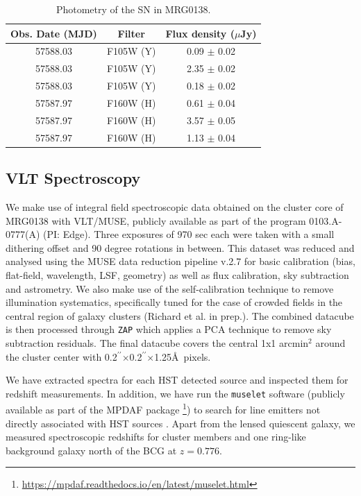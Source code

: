 \documentclass[12pt,dvipsnames]{article}
\gdef\arcsec{$^{\prime\prime}$}
\begin{document}
\begin{table}[h]
\centering
\begin{tabular}{ccc}
Obs. Date (MJD) & Filter & Flux density ($\mu$Jy) \\
\midrule
57588.03 & F105W (Y) & 0.09  $\pm$ 0.02 \\
57588.03 & F105W (Y) & 2.35  $\pm$ 0.02 \\
57588.03 & F105W (Y) & 0.18  $\pm$ 0.02 \\
57587.97 & F160W (H) & 0.61  $\pm$ 0.04 \\
57587.97 & F160W (H) & 3.57  $\pm$ 0.05 \\
57587.97 & F160W (H) & 1.13  $\pm$ 0.04 \\
\end{tabular}
\caption{Photometry of the SN in MRG0138.
\label{tab:photometry}}
\end{table}

\subsection*{VLT Spectroscopy}
\label{sec:vltmuse}

We make use of integral field spectroscopic data obtained on the cluster core of MRG0138 with VLT/MUSE, publicly 
available as part of the program 0103.A-0777(A) (PI: Edge). Three exposures of 970 sec each were taken with a small dithering offset and 90 degree rotations in between. This dataset was reduced and analysed using the MUSE data reduction pipeline v.2.7 \cite{weilbacher_data_2020} for basic calibration (bias, flat-field, wavelength, LSF, geometry) as well as flux calibration, sky subtraction and astrometry. We  also make use of the self-calibration technique \cite{bacon_muse_2017}  to remove illumination systematics, specifically tuned for the case of crowded fields in the central region of galaxy clusters (Richard et al. in prep.). The combined datacube is then processed through {\tt ZAP} \cite{soto_zap_2016} which applies a PCA technique to remove sky subtraction residuals. The final datacube covers the central 1x1 arcmin$^2$ around the cluster center with 0.2\arcsec$\times$0.2\arcsec$\times$1.25\AA\ pixels.

We have extracted spectra for each HST detected source and inspected them for redshift measurements. In addition, we have run the {\tt muselet} software (publicly available as part of the MPDAF package \cite{piqueras_mpdaf_2019}\footnote{\url{https://mpdaf.readthedocs.io/en/latest/muselet.html}}) to search for line emitters not directly associated with HST sources \cite{mahler_strong_2018,lagattuta_probing_2019}. Apart from the lensed quiescent galaxy, we measured spectroscopic redshifts for cluster members and one ring-like background galaxy north of the BCG at $z=0.776$.
\end{document}
